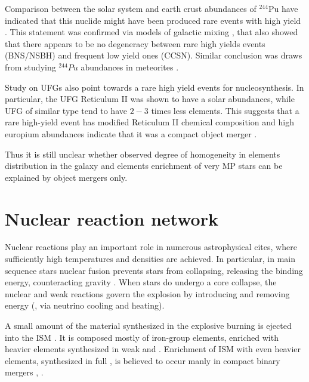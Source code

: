Comparison between the solar system and earth crust abundances of $^{244}$Pu have indicated that this nuclide might have been produced rare events with high yield \citep{Wallner:2015}. This statement was confirmed via models of galactic mixing \citep{Hotokezaka:2015zea}, that also showed that there appears to be no degeneracy between rare high yields events (\ac{BNS}/\ac{NSBH}) and frequent low yield ones (\ac{CCSN}). Similar conclusion was draws from studying $^{244}Pu$ abundances in meteorites \citep{Tsujimoto:2017}.

Study on \acp{UFG} also point towards a rare high yield events for \rproc{} nucleosynthesis. In particular, the \ac{UFG} Reticulum II was shown to have a solar \rproc{} abundances, while \ac{UFG} of similar type tend to have $2-3$ times less \rproc{} elements. This suggests that a rare high-yield event has modified Reticulum II chemical composition and high europium abundances indicate that it was a compact object merger \citep{Ji:2016}. 

Thus it is still unclear whether observed degree of homogeneity in \rproc{} elements distribution in the galaxy and \rproc{} elements enrichment of very \ac{MP} stars can be explained by object mergers only. 




\section{Nuclear reaction network}

Nuclear reactions play an important role in numerous astrophysical cites, where sufficiently high temperatures and densities are achieved. In particular, in main sequence stars nuclear fusion prevents stars from collapsing, releasing the binding energy, counteracting gravity \citep{Bethe:1939}. When stars do undergo a core collapse, the nuclear and weak reactions govern the explosion by introducing and removing energy (\eg, via neutrino cooling and heating). 

A small amount of the material synthesized in the explosive burning is ejected into the \ac{ISM}  \citep{Nomoto:1997if,Woosley:2002}. It is composed mostly of iron-group elements, enriched with heavier elements synthesized in weak \rproc{} \citep{Wanajo:2013} and \sproc{} \citep{Burbidge:1957}. 
Enrichment of \ac{ISM} with even heavier elements, synthesized in full \rproc{}, is believed to occur manly in compact binary mergers \citep{Freiburghaus:1999}, . 

